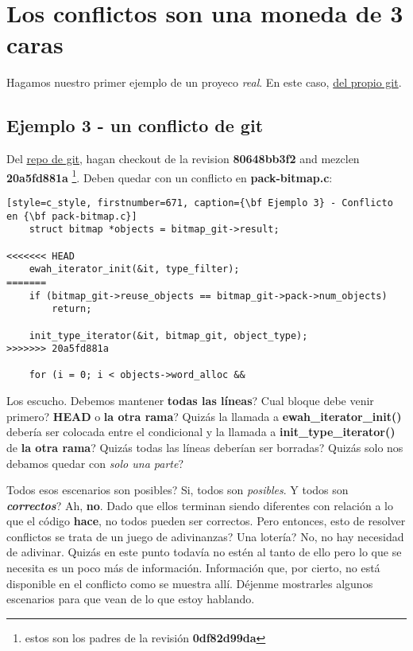 
\section{Los conflictos son una moneda de 3 caras}
\label{diff3}

Hagamos nuestro primer ejemplo de un proyeco {\it real}. En este caso, \hyperref[git_repo]{del propio git}.

\subsection{Ejemplo 3 - un conflicto de git}
\label{example_03}

Del \hyperref[git_repo]{repo de git}, hagan checkout de la revision {\bf 80648bb3f2} and mezclen {\bf 20a5fd881a}
\footnote{estos son los padres de la revisión {\bf 0df82d99da}}. Deben quedar con un conflicto en {\bf pack-bitmap.c}:
\begin{lstlisting}[style=c_style, firstnumber=671, caption={\bf Ejemplo 3} - Conflicto en {\bf pack-bitmap.c}]
	struct bitmap *objects = bitmap_git->result;

<<<<<<< HEAD
	ewah_iterator_init(&it, type_filter);
=======
	if (bitmap_git->reuse_objects == bitmap_git->pack->num_objects)
		return;

	init_type_iterator(&it, bitmap_git, object_type);
>>>>>>> 20a5fd881a

	for (i = 0; i < objects->word_alloc &&
\end{lstlisting}

Los escucho. Debemos mantener {\bf todas las líneas}? Cual bloque debe venir primero? {\bf HEAD} o
{\bf la otra rama}? Quizás la llamada a {\bf ewah\_iterator\_init()} debería ser colocada entre el condicional y
la llamada a {\bf init\_type\_iterator()} de {\bf la otra rama}? Quizás todas las líneas deberían ser borradas?
Quizás solo nos debamos quedar con {\it solo una parte}?

Todos esos escenarios son posibles? Si, todos son {\it posibles}. Y todos son {\bf\it correctos}? Ah, {\bf no}. Dado que ellos
terminan siendo diferentes con relación a lo que el código {\bf hace}, no todos pueden ser correctos. Pero entonces, esto de
resolver conflictos se trata de un juego de adivinanzas? Una lotería? No, no hay necesidad de adivinar. Quizás en este punto
todavía no estén al tanto de ello pero lo que se necesita es un poco más de información. Información que, por cierto, no está
disponible en el conflicto como se muestra allí. Déjenme mostrarles algunos escenarios para que vean de lo que estoy hablando.


